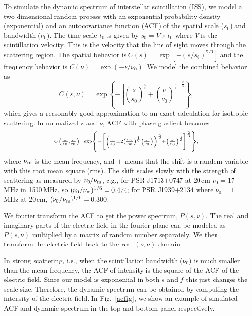 \documentclass[useAMS,usenatbib]{mn2e}
\begin{document}
To simulate the dynamic spectrum of interstellar scintillation (ISS), we model
a two dimensional random process with an exponential probability density (exponential) and  
an autocovariance function (ACF) of the spatial scale ($s_0$) and bandwidth ($\nu_0$). 
The time-scale $t_0$ is given by $s_0 = V\times t_0$ where $V$ is the scintillation velocity. 
This is the velocity that the line of sight moves through the scattering region.
%
The spatial behavior is $C(s) = \exp[-(s/s_0)^{5/3}]$ and the frequency
behavior is $C(\nu) = \exp(-\nu/\nu_0)$. We model the combined behavior as
\begin{equation}
\label{acf}
C(s,\nu) = \exp\left\{-\left[\left(\frac{s}{s_0}\right)^{\frac{5}{2}} + \left(\frac{\nu}{\nu_0}\right)^{\frac{3}{2}}\right]^{\frac{2}{3}}\right\},
\end{equation}
which gives a reasonably good approximation to an exact calculation for isotropic
scattering.
%
In normalized $s$ and $\nu$, ACF with phase gradient becomes 
\begin{equation}
{\scriptstyle C\left(\frac{s}{s_0},\frac{\nu}{\nu_0}\right)=\exp\left\{-\left[\left(\frac{s}{s_0} \pm 2\left(\frac{\nu_0}{\nu_{\rm{m}}}\right)^{\frac{1}{6}}\left(\frac{\nu}{\nu_0}\right)\right)^{\frac{5}{2}} + \left(\frac{\nu}{\nu_0}\right)^{\frac{3}{2}}\right]^{\frac{2}{3}}\right\},}
\end{equation}
where $\nu_{\rm{m}}$ is the mean frequency, and $\pm$ means that the shift is a 
random variable with this root mean square (rms). The shift scales slowly with the 
strength of scattering as measured by $\nu_0/\nu_{\rm{m}}$, e.g., for PSR J1713$+$0747 
at 20\,cm $\nu_0=17$\,MHz in 1500\,MHz, so $(\nu_0/\nu_{\rm{m}})^{1/6} = 0.474$; for PSR J1939$+$2134 
where $\nu_0=1$\,MHz at 20\,cm, $(\nu_0/\nu_{\rm{m}})^{1/6} = 0.300$.

We fourier transform the ACF to get the power spectrum, $P(s,\nu)$. 
The real and imaginary parts of the electric field in the fourier plane can be 
modeled as $P(s,\nu)$ multiplied by a matrix of random number separately.
%
We then transform the electric field back to the real $(s,\nu)$ domain.
%

In strong scattering, i.e., when the scintillation bandwidth ($\nu_0$) is much smaller than 
the mean frequency, the ACF of intensity is the square of the ACF of the electric field. 
Since our model is exponential in both $s$ and $f$ this just changes the scale size.
%
Therefore, the dynamic spectrum can be obtained by computing the intensity of the electric 
field.
%
In Fig.~\ref{acffig}, we show an example of simulated ACF and dynamic spectrum in the 
top and bottom panel respectively.
\end{document}
